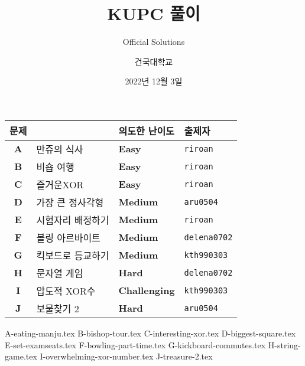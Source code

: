 
\usetikzlibrary{arrows.meta,matrix,decorations.pathreplacing}

\title{KUPC 풀이}
\subtitle{Official Solutions}
\author{건국대학교}
\date{2022년 12월 3일}


    \setcounter{framenumber}{-1}
    \frame{\titlepage}
        
    \begin{frame} %
        \begin{center}
            \begin{tabular}{cl|l|l}
                \hline
                문제 & & 의도한 난이도 & 출제자 \\
                \hline
                \hline
                \textbf{A} & 만쥬의 식사& \textbf{\color{acbronze}Easy} & \texttt{riroan} \\
                \textbf{B} & 비숍 여행 & \textbf{\color{acbronze}Easy} & \texttt{riroan} \\
                \textbf{C} & 즐거운XOR & \textbf{\color{acsilver}Easy} & \texttt{riroan} \\
                \textbf{D} & 가장 큰 정사각형 & \textbf{\color{acsilver}Medium} & \texttt{aru0504} \\
                \textbf{E} & 시험자리 배정하기 & \textbf{\color{acsilver}Medium} & \texttt{riroan} \\
                \textbf{F} & 볼링 아르바이트 & \textbf{\color{acgold}Medium} & \texttt{delena0702} \\
                \textbf{G} & 킥보드로 등교하기 & \textbf{\color{acsilver}Medium} & \texttt{kth990303} \\
                \textbf{H} & 문자열 게임 & \textbf{\color{acgold}Hard} & \texttt{delena0702} \\
                \textbf{I} & 압도적 XOR수 & \textbf{\color{acgold}Challenging} & \texttt{kth990303} \\
                \textbf{J} & 보물찾기 2 & \textbf{\color{acgold}Hard} & \texttt{aru0504} \\
                \hline
            \end{tabular}
        \end{center}
    \end{frame}
    {A-eating-manju.tex}
    {B-bishop-tour.tex}
    {C-interesting-xor.tex}
    {D-biggest-square.tex}
    {E-set-examseats.tex}
    {F-bowling-part-time.tex}
    {G-kickboard-commutes.tex}
    {H-string-game.tex}
    {I-overwhelming-xor-number.tex}
    {J-treasure-2.tex}

